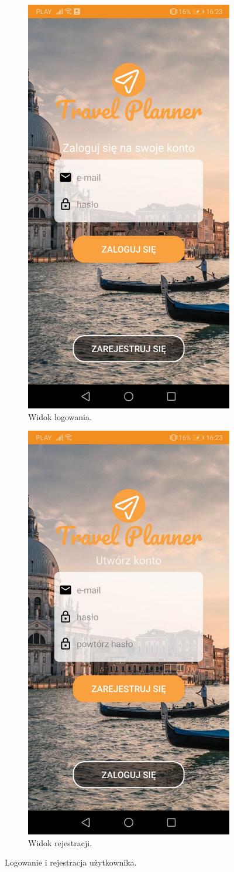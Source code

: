 \documentclass[10pt,twoside,a4paper]{report}
\begin{document}
\begin{figure}[h]
\begin{subfigure}{0.5\textwidth}
\centering
\includegraphics[width=0.9\linewidth, width=5cm]{loginView}
\caption{Widok logowania.}
\label{fig:loginView}
\end{subfigure}
\begin{subfigure}{0.5\textwidth}
\centering
\includegraphics[width=0.9\linewidth, width=5cm]{registrationPage}
\caption{Widok rejestracji.}
\label{fig:registrationPage}
\end{subfigure}
\caption{Logowanie i rejestracja użytkownika.}
\label{fig:podrecznik1}
\end{figure}
\FloatBarrier
\end{document}
